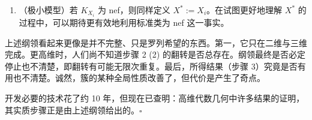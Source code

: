\begin{enumerate}[label=（\arabic*）,leftmargin=2.6em,itemsep=1pt,start=2]
\item （极小模型）若 $K_{X_i}$ 为 nef，则同样定义 $X^*:=X_i$。在试图更好地理解 $X^*$ 的过程中，可以期待更有效地利用标准类为 nef 这一事实。
\end{enumerate}

上述纲领看起来更像是并不完整、只是罗列希望的东西。第一，它只在二维与三维完成。更高维时，人们尚不知道步骤 2 (2) 的翻转是否总存在。纲领最终是否必定停止也不清楚，即翻转有可能无限次重复。最后，所得结果（步骤 3）究竟是否有用也不清楚。诚然，簇的某种全局性质改善了，但代价是产生了奇点。

开发必要的技术花了约 10 年，但现在已查明：高维代数几何中许多结果的证明，其实质步骤正是由上述纲领给出的。\hfill$\square$


